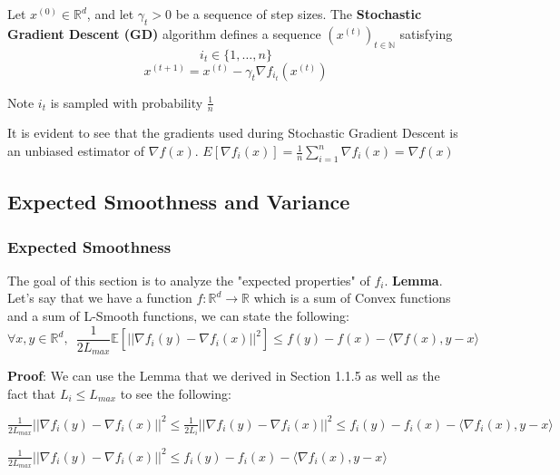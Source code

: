 \noindent Let $x^{(0)} \in \mathbb{R}^d$, and let $\gamma_t > 0$ be a sequence of step sizes. The \textbf{Stochastic Gradient Descent (GD)} algorithm defines a sequence $(x^{(t)})_{t \in \mathbb{N}}$ satisfying 
\begin{equation}
    i_t \in \{1, \dots, n\}
\end{equation}
\begin{equation}
    x^{(t + 1)}  = x^{(t)} - \gamma_t \nabla f_{i_t}(x^{(t)})
\end{equation}

\noindent Note $i_t$ is sampled with probability $\frac{1}{n}$

\noindent It is evident to see that the gradients used during Stochastic Gradient Descent is an unbiased estimator of $\nabla f(x)$. $E[\nabla f_i(x)] = \frac{1}{n} \sum_{i=1}^{n} \nabla f_i(x) = \nabla f(x)$

\subsection{Expected Smoothness and Variance}
\subsubsection{Expected Smoothness}
The goal of this section is to analyze the "expected properties" of $f_i$. \newline 
\noindent \textbf{Lemma}. Let's say that we have a function $f: \mathbb{R}^d \rightarrow \mathbb{R}$ which is a sum of Convex functions and a sum of L-Smooth functions, we can state the following: 
\begin{equation}
    \forall x, y \in \mathbb{R}^d, \enspace \frac{1}{2L_{max}} \mathbb{E}[||\nabla f_i(y) - \nabla f_i(x)||^2] \leq f(y) - f(x) - \langle \nabla f(x), y - x \rangle
\end{equation}

\noindent \textbf{Proof}: 
We can use the Lemma that we derived in Section 1.1.5 as well as the fact that $L_i \leq L_{max}$ to see the following: \newline 

$\frac{1}{2L_{max}} ||\nabla f_i(y) - \nabla f_i(x)||^2 \leq \frac{1}{2L_i} ||\nabla f_i(y) - \nabla f_i(x)||^2 \leq f_i(y) - f_i(x) - \langle \nabla f_i(x), y - x \rangle$ \newline 

$\frac{1}{2L_{max}} ||\nabla f_i(y) - \nabla f_i(x)||^2 \leq f_i(y) - f_i(x) - \langle \nabla f_i(x), y - x \rangle$ \newline 


